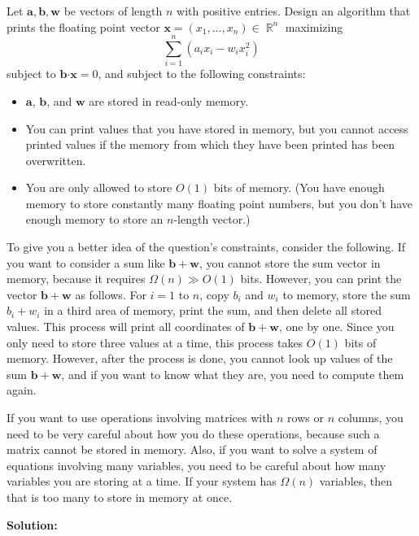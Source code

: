 \documentclass{article}
\DeclareMathOperator{\R}{\mathbb R}
\newcommand{\mb}{\mathbf}
\newcommand{\dotp}{\boldsymbol{\cdot}}
\begin{document}
Let $\mb a, \mb b, \mb w$ be vectors of length $n$ with positive entries. Design an algorithm that prints the floating point vector $\mb x = (x_1, \dots, x_n) \in \R^n$ maximizing
\[\sum_{i=1}^n ( a_i x_i - w_i x_i^2 )\]
subject to $\mb b \dotp \mb x = 0$, and subject to the following constraints:
\begin{itemize}
\item $\mb a$, $\mb b$, and $\mb w$ are stored in read-only memory.
\item You can print values that you have stored in memory, but you cannot access printed values if the memory from which they have been printed has been overwritten.
\item You are only allowed to store $O(1)$ bits of memory. (You have enough memory to store constantly many floating point numbers, but you don't have enough memory to store an $n$-length vector.)
\end{itemize}
To give you a better idea of the question's constraints, consider the following. If you want to consider a sum like $\mb b + \mb w$, you cannot store the sum vector in memory, because it requires $\Omega(n)  \gg O(1)$ bits. However, you can print the vector $\mb b + \mb w$ as follows. For $i=1$ to $n$, copy $b_i$ and $w_i$ to memory, store the sum $b_i + w_i$ in a third area of memory, print the sum, and then delete all stored values. This process will print all coordinates of $\mb b + \mb w$, one by one. Since you only need to store three values at a time, this process takes $O(1)$ bits of memory. However, after the process is done, you cannot look up values of the sum $\mb b + \mb w$, and if you want to know what they are, you need to compute them again.

If you want to use operations involving matrices with $n$ rows or $n$ columns, you need to be very careful about how you do these operations, because such a matrix cannot be stored in memory. Also, if you want to solve a system of equations involving many variables, you need to be careful about how many variables you are storing at a time. If your system has $\Omega(n)$ variables, then that is too many to store in memory at once.

\textbf{Solution:} \\
\end{document}
